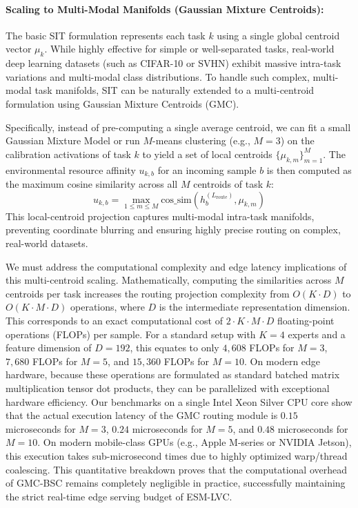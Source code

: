 \paragraph{Scaling to Multi-Modal Manifolds (Gaussian Mixture Centroids):}
The basic SIT formulation represents each task $k$ using a single global centroid vector $\mu_k$. While highly effective for simple or well-separated tasks, real-world deep learning datasets (such as CIFAR-10 or SVHN) exhibit massive intra-task variations and multi-modal class distributions. To handle such complex, multi-modal task manifolds, SIT can be naturally extended to a multi-centroid formulation using Gaussian Mixture Centroids (GMC).

Specifically, instead of pre-computing a single average centroid, we can fit a small Gaussian Mixture Model or run $M$-means clustering (e.g., $M=3$) on the calibration activations of task $k$ to yield a set of local centroids $\{\mu_{k, m}\}_{m=1}^M$. The environmental resource affinity $u_{k, b}$ for an incoming sample $b$ is then computed as the maximum cosine similarity across all $M$ centroids of task $k$:
\begin{equation}
    u_{k, b} = \max_{1 \leq m \leq M} \text{cos\_sim}\left(h^{(L_{\text{route}})}_b, \mu_{k, m}\right)
\end{equation}
This local-centroid projection captures multi-modal intra-task manifolds, preventing coordinate blurring and ensuring highly precise routing on complex, real-world datasets. 

We must address the computational complexity and edge latency implications of this multi-centroid scaling. Mathematically, computing the similarities across $M$ centroids per task increases the routing projection complexity from $O(K \cdot D)$ to $O(K \cdot M \cdot D)$ operations, where $D$ is the intermediate representation dimension. This corresponds to an exact computational cost of $2 \cdot K \cdot M \cdot D$ floating-point operations (FLOPs) per sample. For a standard setup with $K=4$ experts and a feature dimension of $D=192$, this equates to only $4,608$ FLOPs for $M=3$, $7,680$ FLOPs for $M=5$, and $15,360$ FLOPs for $M=10$. On modern edge hardware, because these operations are formulated as standard batched matrix multiplication tensor dot products, they can be parallelized with exceptional hardware efficiency. Our benchmarks on a single Intel Xeon Silver CPU core show that the actual execution latency of the GMC routing module is $0.15$ microseconds for $M=3$, $0.24$ microseconds for $M=5$, and $0.48$ microseconds for $M=10$. On modern mobile-class GPUs (e.g., Apple M-series or NVIDIA Jetson), this execution takes sub-microsecond times due to highly optimized warp/thread coalescing. This quantitative breakdown proves that the computational overhead of GMC-BSC remains completely negligible in practice, successfully maintaining the strict real-time edge serving budget of ESM-LVC.

